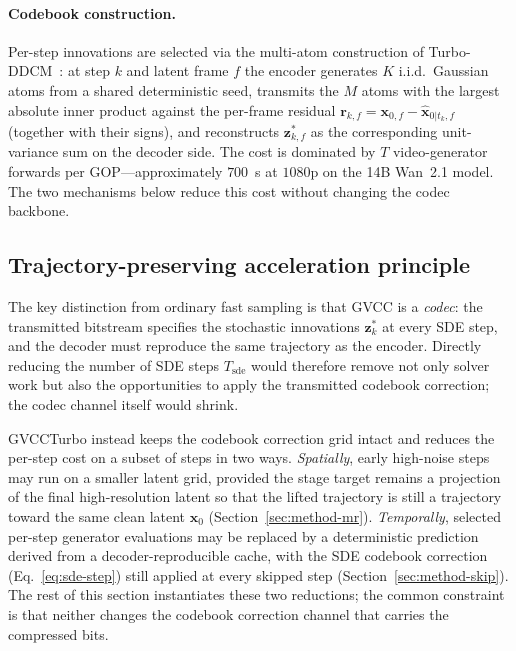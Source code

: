 \paragraph{Codebook construction.}
Per-step innovations are selected via the multi-atom construction of
Turbo-DDCM~\cite{vaisman2025turboddcm}: at step $k$ and latent frame
$f$ the encoder generates $K$ i.i.d.\ Gaussian atoms from a shared
deterministic seed, transmits the $M$ atoms with the largest absolute
inner product against the per-frame residual
$\mathbf{r}_{k,f}\!=\!\mathbf{x}_{0,f}\!-\!\hat{\mathbf{x}}_{0|t_k,f}$
(together with their signs), and reconstructs $\mathbf{z}^*_{k,f}$ as
the corresponding unit-variance sum on the decoder side. The cost is
dominated by $T$ video-generator forwards per GOP---approximately
$700$~s at $1080$p on the 14B Wan~2.1 model. The two mechanisms below
reduce this cost without changing the codec backbone.

\subsection{Trajectory-preserving acceleration principle}
\label{sec:method-principle}

The key distinction from ordinary fast sampling is that GVCC is a
\emph{codec}: the transmitted bitstream specifies the stochastic
innovations $\mathbf{z}^*_k$ at every SDE step, and the decoder must
reproduce the same trajectory as the encoder. Directly reducing the
number of SDE steps $T_\text{sde}$ would therefore remove not only solver
work but also the opportunities to apply the transmitted codebook
correction; the codec channel itself would shrink.

GVCCTurbo instead keeps the codebook correction grid intact and reduces
the per-step cost on a subset of steps in two ways. \emph{Spatially},
early high-noise steps may run on a smaller latent grid, provided the
stage target remains a projection of the final high-resolution latent so
that the lifted trajectory is still a trajectory toward the same clean
latent $\mathbf{x}_0$ (Section~\ref{sec:method-mr}). \emph{Temporally},
selected per-step generator evaluations may be replaced by a
deterministic prediction derived from a decoder-reproducible cache, with
the SDE codebook correction (Eq.~\ref{eq:sde-step}) still applied at
every skipped step (Section~\ref{sec:method-skip}). The rest of this
section instantiates these two reductions; the common constraint is that
neither changes the codebook correction channel that carries the
compressed bits.

